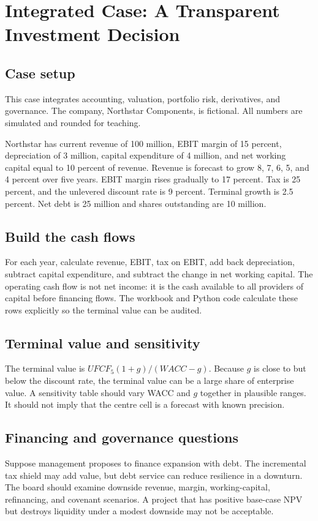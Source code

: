 \chapter{Integrated Case: A Transparent Investment Decision}

\section{Case setup}
This case integrates accounting, valuation, portfolio risk, derivatives, and governance. The company, Northstar Components, is fictional. All numbers are simulated and rounded for teaching.

Northstar has current revenue of 100 million, EBIT margin of 15 percent, depreciation of 3 million, capital expenditure of 4 million, and net working capital equal to 10 percent of revenue. Revenue is forecast to grow 8, 7, 6, 5, and 4 percent over five years. EBIT margin rises gradually to 17 percent. Tax is 25 percent, and the unlevered discount rate is 9 percent. Terminal growth is 2.5 percent. Net debt is 25 million and shares outstanding are 10 million.

\section{Build the cash flows}
For each year, calculate revenue, EBIT, tax on EBIT, add back depreciation, subtract capital expenditure, and subtract the change in net working capital. The operating cash flow is not net income: it is the cash available to all providers of capital before financing flows. The workbook and Python code calculate these rows explicitly so the terminal value can be audited.

\section{Terminal value and sensitivity}
The terminal value is $UFCF_5(1+g)/(WACC-g)$. Because $g$ is close to but below the discount rate, the terminal value can be a large share of enterprise value. A sensitivity table should vary WACC and $g$ together in plausible ranges. It should not imply that the centre cell is a forecast with known precision.

\section{Financing and governance questions}
Suppose management proposes to finance expansion with debt. The incremental tax shield may add value, but debt service can reduce resilience in a downturn. The board should examine downside revenue, margin, working-capital, refinancing, and covenant scenarios. A project that has positive base-case NPV but destroys liquidity under a modest downside may not be acceptable.

